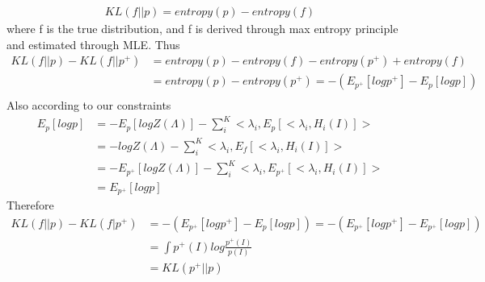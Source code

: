\documentclass[12pt]{article}
\newenvironment{problem}[2][Problem]{\begin{trivlist}
\item[\hskip \labelsep {\bfseries #1}\hskip \labelsep {\bfseries #2}]}{\end{trivlist}}
\begin{document}
\begin{problem}{1.}
\begin{align*}
KL(f||p) = entropy(p) - entropy(f)
\end{align*}
where f is the true distribution, and f is derived through max entropy principle and estimated through MLE. Thus 
\begin{align*}
	KL(f||p) - KL(f||p^+) &= entropy(p) - entropy(f) - entropy(p^+) + entropy(f) \\
	&= entropy(p) - entropy(p^+) = -(E_{p^+}[logp^+] - E_p[logp])\\
\end{align*}
Also according to our constraints
\begin{align*}
	E_p[logp] &= -E_p[logZ(\Lambda)] - \sum_i^K <\lambda_i, E_p[<\lambda_i, H_i(I)]>\\
	&= -logZ(\Lambda) - \sum_i^K <\lambda_i, E_f[<\lambda_i, H_i(I)]>\\
	&= -E_{p^+}[logZ(\Lambda)] - \sum_i^K <\lambda_i, E_{p^+}[<\lambda_i, H_i(I)]>\\
	&= E_{p^+}[logp]
\end{align*}
Therefore
\begin{align*}
	KL(f||p) - KL(f|p^+) &= -(E_{p^+}[logp^+] - E_p[logp]) = -(E_{p^+}[logp^+] - E_{p^+}[logp]) \\
	&= \int p^+(I) log\frac{p^+(I)}{p(I)} \\
	&= KL(p^+||p)
\end{align*}
\end{problem}
\end{document}
